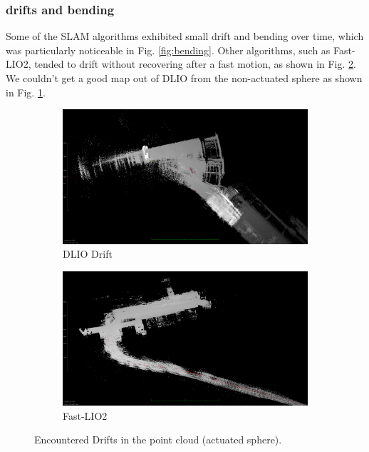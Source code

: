 \documentclass[conference]{IEEEtran}
\begin{document}
\subsubsection{drifts and bending}
Some of the SLAM algorithms exhibited small drift and bending over time, which was particularly noticeable in Fig. \ref{fig:bending}. Other algorithms, such as Fast-LIO2, tended to drift without recovering after a fast motion, as shown in Fig. \ref{fig:lio_drift}. We couldn't get a good map out of DLIO from the non-actuated sphere as shown in Fig. \ref{fig:dlio_drift}.
\begin{figure}[htbp]
\centering
\begin{subfigure}{0.42\columnwidth}
    \centering
    \includegraphics[width=\textwidth]{pics/drifts_bending/dlio_drift.png}
    \caption{DLIO Drift}\label{fig:dlio_drift}
    \end{subfigure}
\hfill
\begin{subfigure}{0.41\columnwidth}
    \centering
    \includegraphics[width=\textwidth]{pics/drifts_bending/lio_drifts.png}
    \caption{Fast-LIO2}\label{fig:lio_drift}
\end{subfigure}
\hfill
\caption{Encountered Drifts in the point cloud (actuated sphere).}
\label{fig:drift}
\end{figure}
\end{document}
